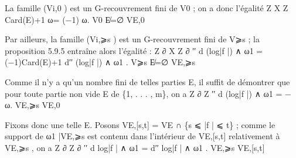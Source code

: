 \documentclass[
  10pt,
]{article}
\newenvironment{Shaded}{}{}
\newcommand{\NormalTok}[1]{#1}
\begin{document}
\begin{Shaded}
\begin{Highlighting}[]
\NormalTok{  La famille (Vi,0 ) est un G{-}recouvrement fini de V0 ; on a donc l’égalité}
\NormalTok{                             Z       X                 Z}
\NormalTok{                                             Card(E)+1}
\NormalTok{                                 ω=    (−1)                 ω.}
\NormalTok{                                  V0      E̸=∅                VE,0}


\NormalTok{Par ailleurs, la famille (Vi,⩾s ) est un G{-}recouvrement fini de V⩾s ; la proposition 5.9.5}
\NormalTok{entraîne alors l’égalité :}
\NormalTok{              Z ∂                      X                Z ∂}
\NormalTok{                    ′′}
\NormalTok{                   d (log|f |) ∧ ω1 =     (−1)Card(E)+1}
\NormalTok{                                                             d′′ (log|f |) ∧ ω1 .}
\NormalTok{                V⩾s                       E̸=∅                VE,⩾s}


\NormalTok{Comme il n’y a qu’un nombre fini de telles parties E, il suffit de démontrer que pour}
\NormalTok{toute partie non vide E de \{1, . . . , m\}, on a}
\NormalTok{                          Z ∂                           Z}
\NormalTok{                                      ′′}
\NormalTok{                                   d (log|f |) ∧ ω1 = −   ω.}
\NormalTok{                                  VE,⩾s                       VE,0}

\NormalTok{Fixons donc une telle E. Posons VE,[s,t] = VE ∩ \{s ⩽ |f | ⩽ t\} ; comme le support}
\NormalTok{de ω1 |VE,⩾s est contenu dans l’intérieur de VE,[s,t] relativement à VE,⩾s , on a}
\NormalTok{                        Z ∂                    Z ∂}
\NormalTok{                               ′′}
\NormalTok{                             d log|f | ∧ ω1 =            d′′ log|f | ∧ ω1 .}
\NormalTok{                          VE,⩾s                    VE,[s,t]}


\end{Highlighting}
\end{Shaded}
\end{document}
